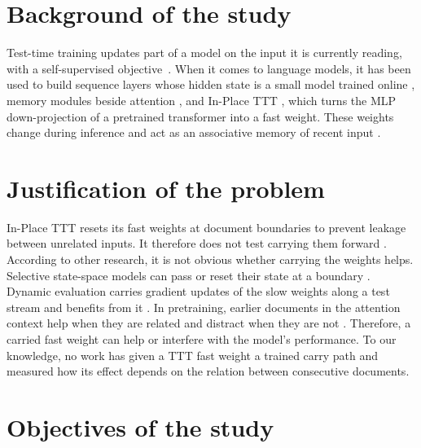 \documentclass[12pt,a4paper]{report}
\begin{document}
\section{Background of the study}

Test-time training updates part of a model on the input it is currently reading, with a self-supervised objective~\citep{sun2020ttt}. When it comes to language models, it has been used to build sequence layers whose hidden state is a small model trained online \citep{sun2025learning}, memory modules beside attention \citep{behrouz2025titans}, and In-Place TTT \citep{feng2026inplace}, which turns the MLP down-projection of a pretrained transformer into a fast weight. These weights change during inference and act as an associative memory of recent input \citep{hinton1987using,schmidhuber1992learning,ba2016using,schlag2021linear}.

\section{Justification of the problem}

In-Place TTT resets its fast weights at document boundaries to prevent leakage between unrelated inputs. It therefore does not test carrying them forward \citep{feng2026inplace}. According to other research, it is not obvious whether carrying the weights helps. Selective state-space models can pass or reset their state at a boundary \citep{gu2024mamba}. Dynamic evaluation carries gradient updates of the slow weights along a test stream and benefits from it \citep{krause2018dynamic}. In pretraining, earlier documents in the attention context help when they are related and distract when they are not \citep{zhao2024analysing}. Therefore, a carried fast weight can help or interfere with the model's performance. To our knowledge, no work has given a TTT fast weight a trained carry path and measured how its effect depends on the relation between consecutive documents.

\section{Objectives of the study}
\end{document}
